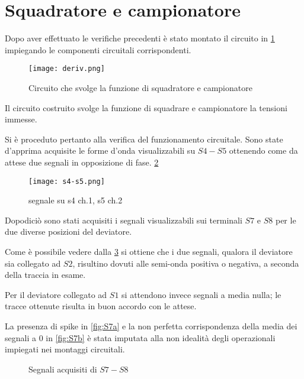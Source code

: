\section{Squadratore e campionatore}
	Dopo aver effettuato le verifiche precedenti è stato montato il 
	circuito in 
	\figurename{ \ref{fig:sqd} }
	impiegando le componenti circuitali corrispondenti.
	
	\begin{figure}[ht]
		\centering
		\texttt{[image: deriv.png]}
		\caption{Circuito che svolge la funzione di squadratore e campionatore}
		\label{fig:sqd}
	\end{figure}

	Il circuito costruito svolge la funzione di squadrare e campionatore la tensioni immesse.
	
	Si è proceduto pertanto alla verifica del funzionamento circuitale.
	Sono state d'apprima acquisite le forme d'onda visualizzabili su $S4-S5$
	ottenendo come da attese due segnali in opposizione di fase.
	\figurename{ \ref{f:s4-s5} }
	
	\begin{figure}[ht]
		\centering
		\texttt{[image: s4-s5.png]}
		\caption{segnale su s4 ch.1, s5 ch.2 }
		\label{f:s4-s5}
	\end{figure}
	
	Dopodiciò sono stati acquisiti i segnali visualizzabili sui terminali $S7$ e $S8$
	per le due diverse posizioni del deviatore.
	
	Come è possibile vedere dalla \figurename{\ref{fig:s7}} si ottiene che i due segnali, qualora il
	deviatore sia collegato ad $S2$,  risultino dovuti alle semi-onda
	positiva o negativa, a seconda della traccia in esame.
	
	Per il deviatore collegato ad $S1$
	si attendono invece segnali a media nulla; le tracce ottenute risulta in buon accordo 
	con le attese.
	
	La presenza di spike in \figurename{\ref{fig:S7a}} e la non perfetta corrispondenza della media dei segnali a $0$ in \figurename{\ref{fig:S7b}} è stata imputata alla non idealità 
	degli operazionali impiegati nei montaggi circuitali.
	\begin{figure}[h]
		\centering
		\caption{Segnali acquisiti di $S7-S8$}
		\label{fig:s7}
	\end{figure}
